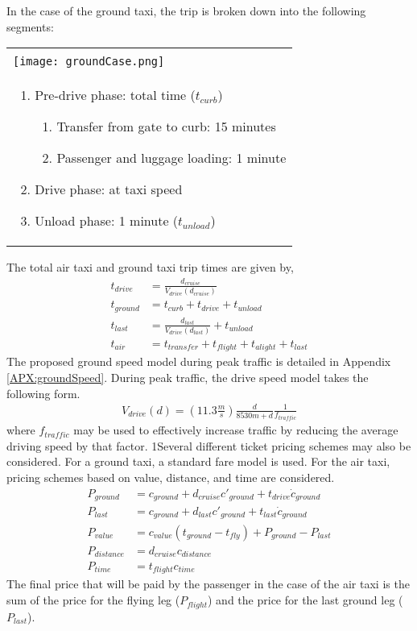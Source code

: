 \documentclass[12pt, letter]{article}
\begin{document}
\noindent In the case of the ground taxi, the trip is broken down into the following segments:
\begin{table}[H]
	\begin{tabular}{|p{5in}|}
	\hline
		\\\texttt{[image: groundCase.png]}\\
		\begin{enumerate}
			\item Pre-drive phase: total time ($t_{curb}$)
			\begin{enumerate}
			  \item Transfer from gate to curb: 15 minutes
				\item Passenger and luggage loading: 1 minute
			\end{enumerate}
			\item Drive phase: at taxi speed
			\item Unload phase: 1 minute ($t_{unload}$)
		\end{enumerate}
		\\ \hline
	\end{tabular}
\end{table}
\noindent The total air taxi and ground taxi trip times are given by,
\begin{align}
	t_{drive}&=\frac{d_{cruise}}{V_{drive}\left(d_{cruise}\right)}\\
	t_{ground}&=t_{curb}+t_{drive}+t_{unload}\\
	t_{last}&=\frac{d_{last}}{V_{drive}\left(d_{last}\right)}+t_{unload}\\
	t_{air}&=t_{transfer}+t_{flight}+t_{alight}+t_{last}
\end{align}
The proposed ground speed model during peak traffic is detailed in Appendix \ref{APX:groundSpeed}. During peak traffic, the drive speed model takes the following form.
\begin{align}
	V_{drive}(d)=\left(11.3\frac{m}{s}\right)\frac{d}{8530m+d}\frac{1}{f_{traffic}}
\end{align}
where $f_{traffic}$ may be used to effectively increase traffic by reducing the average driving speed by that factor.
1Several different ticket pricing schemes may also be considered. For a ground taxi, a standard fare model is used. For the air taxi, pricing schemes based on value, distance, and time are considered.
\begin{align}
	P_{ground}&=c_{ground}+d_{cruise} c'_{ground}+t_{drive} \dot{c}_{ground}\\
	P_{last}&=c_{ground}+d_{last} c'_{ground}+t_{last} \dot{c}_{ground}\\
	P_{value}&=c_{value}\left(t_{ground}-t_{fly}\right)+P_{ground}-P_{last}\\
	P_{distance}&=d_{cruise} c_{distance}\\
	P_{time}&=t_{flight} c_{time}
\end{align}
The final price that will be paid by the passenger in the case of the air taxi is the sum of the price for the flying leg ($P_{flight}$) and the price for the last ground leg ($P_{last}$).
\end{document}
